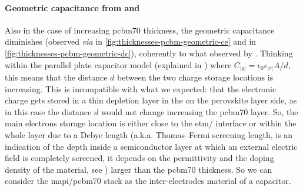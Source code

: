 	\paragraph{Geometric capacitance from  and }
	Also in the case of increasing \gls{pcbm70}  thickness, the geometric capacitance diminishes (observed \textsl{via}  in \cref{fig:thicknesses-pcbm-geometric-ce} and  in \cref{fig:thicknesses-pcbm-geometric-dc}), coherently to what observed by .
	Thinking within the parallel plate capacitor model (explained in ) where $C_|g| = \epsilon_0 \epsilon_|r| A / d$, this means that the distance $d$ between the two charge storage locations is increasing.
	This is incompatible with what we expected: that the electronic charge gets stored in a thin depletion layer in the  on the perovskite layer side, as in this case the distance $d$ would not change increasing the \gls{pcbm70} layer.
	So, the main electrons storage location is either close to the \gls{etm}\-/ interface or within the whole  layer due to a Debye length (a.k.a. Thomas–Fermi screening length, is an indication of the depth inside a semiconductor layer at which an external electric field is completely screened, it depends on the permittivity and the doping density of the material, see ) larger than the \gls{pcbm70} thickness.
	So we can consider the \gls{mapi}\-/\gls{pcbm70} stack as the inter\hyp{}electrodes material of a capacitor.


